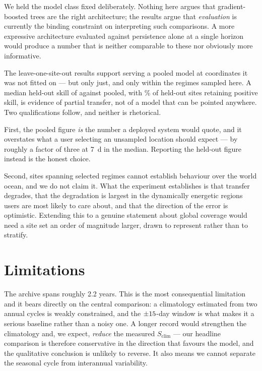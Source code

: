 We held the model class fixed deliberately. Nothing here argues that
gradient-boosted trees are the right architecture; the results argue that
\emph{evaluation} is currently the binding constraint on interpreting such
comparisons. A more expressive architecture evaluated against persistence alone
at a single horizon would produce a number that is neither comparable to these
nor obviously more informative.

The leave-one-site-out results support serving a pooled model at coordinates it
was not fitted on --- but only just, and only within the regimes sampled here.
A median held-out skill of \MedLosoSeven{} against \MedPooledSeven{} pooled,
with \LosoPositiveShare{}\% of held-out sites retaining positive skill, is
evidence of partial transfer, not of a model that can be pointed anywhere.
Two qualifications follow, and neither is rhetorical.

First, the pooled figure \emph{is} the number a deployed system would quote,
and it overstates what a user selecting an unsampled location should expect ---
by roughly a factor of three at \SI{7}{\day} in the median. Reporting the
held-out figure instead is the honest choice.

Second, \NSites{} sites spanning selected regimes cannot establish behaviour
over the world ocean, and we do not claim it. What the experiment establishes
is that transfer degrades, that the degradation is largest in the dynamically
energetic regions users are most likely to care about, and that the direction
of the error is optimistic. Extending this to a genuine statement about global
coverage would need a site set an order of magnitude larger, drawn to represent
rather than to stratify.

\section{Limitations}
\label{sec:limitations}

The archive spans roughly 2.2 years. This is the most consequential limitation
and it bears directly on the central comparison: a climatology estimated from
two annual cycles is weakly constrained, and the $\pm15$-day window is
what makes it a serious baseline rather than a noisy one. A longer record would
strengthen the climatology and, we expect, \emph{reduce} the measured
$S_{\mathrm{clim}}$ --- our headline comparison is therefore conservative in
the direction that favours the model, and the qualitative conclusion is
unlikely to reverse. It also means we cannot separate the seasonal cycle from
interannual variability.

